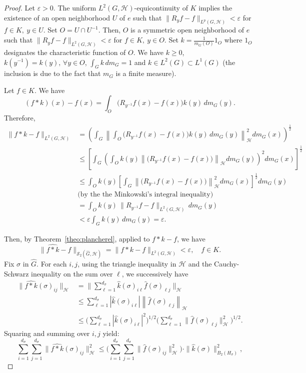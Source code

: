 \documentclass[11pt]{amsart}
\begin{document}
\begin{proof}
Let $\varepsilon>0$. The uniform $L^2(G,\mathcal{H})$-equicontinuity of $K$ implies the existence of an open neighborhood $U$ of $e$ such that $\|R_yf-f\|_{L^p(G,\mathcal{H})}
<\varepsilon$ for $f\in K,\ y\in U$.  
 Set $O=U\cap U^{-1}$. Then, $O$
is a symmetric open neighborhood  of $e$ 
such that $\|R_yf-f\|_{L^2(G,\mathcal{H})}<\varepsilon$ for $f\in K,\ y\in O$.  Set $k=\displaystyle\frac{1}{m_G(O)}1_O$ where $1_O$ designates the characteristic function of $O$. We have 
 $k\ge0$, $k(y^{-1})=k(y), \, \forall y\in O$, $\displaystyle\int_Gk\,dm_G=1$ and 
$k\in  L^2(G)\subset L^1(G)$ (the inclusion is due to the fact that $m_G$ is a finite measure).

Let $f\in K$. We have  $$(f*k)(x)-f(x)=\int_O\big(R_{y^{-1}}f(x)-f(x)\big)k(y)\,dm_G(y).$$ 
Therefore, 
\begin{align*}
\|f*k-f\|_{L^2(G,\mathcal{H})}&=\left(\int_G\left\|\int_O\big(R_{y^{-1}}f(x)-f(x)\big)k(y)\,dm_G(y)\right\|_{\mathcal{H}}^2dm_G(x)\right)^{\frac{1}{2}}\\
&\le \left[\int_G\left(\int_O k(y)\left\|\big(R_{y^{-1}}f(x)-f(x)\big)\right\|_{\mathcal{H}}dm_G(y)\right)^2dm_G(x)\right]^{\frac{1}{2}}\\
&\leq \int_O k(y) \left[\int_G \left\|\big(R_{y^{-1}}f(x)-f(x)\big)\right\|_{\mathcal{H}}^2 dm_G(x)\right]^{\frac{1}{2}} dm_G(y)\\
&\text{(by the the Minkowski's integral inequality)}\\
&=\int_Ok(y)\,\|R_{y^{-1}}f-f\|_{L^2(G,\mathcal{H})}\,dm_G(y)\\
&<\varepsilon \int_Gk(y)\,dm_G(y)=\varepsilon.
\end{align*}

Then, by Theorem~\ref{theo:plancherel}, 
 applied to $f*k-f$, we have
$$
\|\widehat{f*k}-\widehat f\|_{\mathscr{S}_2(\widehat{G},\mathcal{H})}=\|f*k-f\|_{L^2(G,\mathcal{H})}<\varepsilon,\quad f\in K.
$$
 Fix $\sigma$ in $\widehat{G}$. For each $i,j$, using the triangle inequality in $\mathcal{H}$ and the  Cauchy-Schwarz inequality on the sum over $\ell$, we successively have
 \begin{align*}
\big\|\widehat{f*k}(\sigma)_{ij}\big\|_\mathcal{H}&=\Big\|\sum_{\ell=1}^{d_\sigma}\widehat k(\sigma)_{i\ell}
\widehat{f}(\sigma)_{\ell j}\Big\|_\mathcal{H}\\
&\leq \sum_{\ell=1}^{d_\sigma}|\widehat k(\sigma)_{i\ell}|
\left\|\widehat{f}(\sigma)_{\ell j}\right\|_\mathcal{H}\\
&\le\Big(\sum_{\ell=1}^{d_\sigma}|\widehat k(\sigma)_{i\ell}|^2\Big)^{1/2}
\Big(\sum_{\ell=1}^{d_\sigma}\|\widehat{f}(\sigma)_{\ell j}\|_\mathcal{H}^2\Big)^{1/2}.
\end{align*}
Squaring and  summing over $i,j$  yield:
\begin{equation}\label{Path}
\sum_{i=1}^{d_\sigma}\sum_{j=1}^{d_\sigma}\big\|\widehat{f*k}(\sigma)_{ij}\big\|_\mathcal{H}^2\le\Big(\sum_{i=1}^{d_\sigma}\sum_{j=1}^{d_\sigma}
\|\widehat{f}(\sigma)_{ij}\|_\mathcal{H}^2\Big)\cdot\|\widehat k(\sigma)\|_{B_2(H_\sigma)}^2,
\end{equation}
 

\end{proof}
\end{document}
